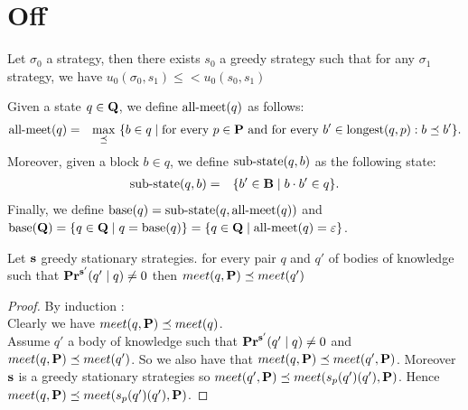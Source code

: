 
\newcommand{\ameet}{\text{\rm all-meet}}
\newcommand{\base}{\text{\rm base}}

\section{Off}

\begin{myprop}
	Let $\sigma_0$ a strategy, then there exists $s_0$ a greedy strategy  such that for any $\sigma_1$ strategy, we have $u_0(\sigma_0,s_1) \leq < u_0(s_0,s_1)$ 
\end{myprop}

Given a state $q \in \mathbf{Q}$, we define $\ameet(q)$ as follows:
\begin{eqnarray*}
\ameet(q)  & =  & \max_{\preceq} \ \{b \in q \mid \text{for every } p\in \bP \text{ and for every } b' \in \longest(q,p): b \preceq b'\}.
\end{eqnarray*}
Moreover, given a block $b \in q$, we define ${\text{\rm sub-state}}(q,b)$ as the following state:
\begin{eqnarray*}
{\text{\rm sub-state}}(q,b) & = & \{ b' \in \mathbf{B} \mid b \cdot b' \in q\}.
\end{eqnarray*}
Finally, 
we define $\base(q) = \subbody(q,\ameet(q))$ 
and $\base(\bQ) = \{q \in \bQ \mid q = \base(q)\} = \{q \in \bQ \mid \ameet(q) = \varepsilon \}$.

\begin{mylem}
	\label{lem-meet}
	Let $\mathbf{s}$ greedy stationary strategies. for every pair $q$ and $q'$ of bodies of knowledge such that $\mathbf{Pr}^{\mathbf{s}'}(q' \mid q) \neq 0$ then $meet(q,\mathbf{P}) \preceq meet(q')$
\end{mylem}	
\begin{proof}
	By induction : 
	\\Clearly we have $meet(q,\mathbf{P}) \preceq meet(q)$.
	\\Assume $q'$ a body of knowledge such that $\mathbf{Pr}^{\mathbf{s}'}(q' \mid q) \neq 0$ and $meet(q,\mathbf{P}) \preceq meet(q')$. So we also have that $meet(q,\mathbf{P}) \preceq meet(q',\mathbf{P})$. Moreover $\mathbf{s}$ is a greedy stationary strategies so $meet(q',\mathbf{P}) \preceq meet(s_p(q')(q'),\mathbf{P})$. Hence $meet(q,\mathbf{P}) \preceq meet(s_p(q')(q'),\mathbf{P})$.
	
\end{proof}


